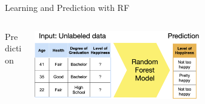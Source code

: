 \documentclass[11pt,compress,t,notes=noshow, xcolor=table]{beamer}
\begin{document}
\begin{vbframe}{Learning and Prediction with RF}
\begin{columns}
\begin{column}{0.05\textwidth} 
\begin{center}
\vspace{0.7cm}
Prediction
\end{center}
\end{column}
\begin{column}{0.95\textwidth} 
\begin{center}
  \includegraphics[width = 0.6\textwidth]{slides/forests/figure_man/nutshell-randomforest-prediction.png} 
\end{center}
\end{column}
\end{columns}

\end{vbframe} 

\end{document}

